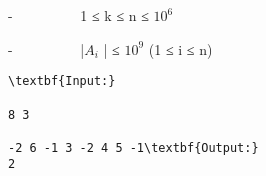 -          1 ≤ k ≤ n ≤ $10^{6}$

   -          |$A_{i}$   | ≤ $10^{9}$   (1 ≤ i ≤ n)
\begin{verbatim}
\textbf{Input:}

8 3

-2 6 -1 3 -2 4 5 -1\textbf{Output:}
2\end{verbatim}